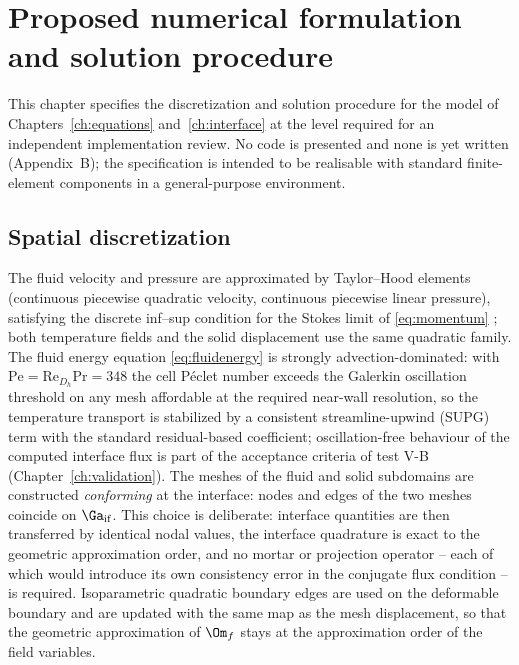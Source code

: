 \chapter{Proposed numerical formulation and solution procedure}
\label{ch:numerics}

This chapter specifies the discretization and solution procedure for the model of
Chapters~\ref{ch:equations} and~\ref{ch:interface} at the level required for an independent
implementation review. No code is presented and none is yet written (Appendix~B); the specification
is intended to be realisable with standard finite-element components in a general-purpose
environment.

\section{Spatial discretization}
The fluid velocity and pressure are approximated by Taylor--Hood elements (continuous piecewise
quadratic velocity, continuous piecewise linear pressure), satisfying the discrete inf--sup
condition for the Stokes limit of \eqref{eq:momentum} \cite{hood1974navier,brezzi1991mixed}; both
temperature fields and the solid displacement use the same quadratic family. The fluid energy
equation \eqref{eq:fluidenergy} is strongly advection-dominated: with
$\mathrm{Pe}=\mathrm{Re}_{D_h}\mathrm{Pr}=348$ the cell P\'eclet number exceeds the Galerkin
oscillation threshold on any mesh affordable at the required near-wall resolution, so the
temperature transport is stabilized by a consistent streamline-upwind (SUPG) term with the
standard residual-based coefficient; oscillation-free behaviour of the computed interface flux is
part of the acceptance criteria of test V-B (Chapter~\ref{ch:validation}). The meshes of the
fluid and solid subdomains are constructed \emph{conforming} at the interface: nodes and edges of
the two meshes coincide on $\Ga_{\mathrm{if}}$. This choice is deliberate: interface quantities are
then transferred by identical nodal values, the interface quadrature is exact to the geometric
approximation order, and no mortar or projection operator -- each of which would introduce its own
consistency error in the conjugate flux condition -- is required. Isoparametric quadratic boundary
edges are used on the deformable boundary and are updated with the same map as the mesh
displacement, so that the geometric approximation of $\Om_f$ stays at the approximation order of
the field variables.

